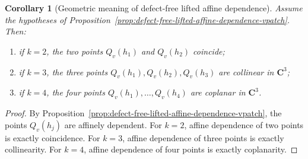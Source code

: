 \documentclass[11pt,a4paper]{amsart}
\theoremstyle{plain}
\newtheorem{corollary}[theorem]{Corollary}
\theoremstyle{definition}
\begin{document}
\begin{corollary}[Geometric meaning of defect-free lifted affine dependence]
\label{cor:geometric-meaning-defect-free-lifted-affine-dependence-vpatch}
Assume the hypotheses of
Proposition~\ref{prop:defect-free-lifted-affine-dependence-vpatch}. Then:
\begin{enumerate}
\item if $k=2$, the two points $Q_v(h_1)$ and $Q_v(h_2)$ coincide;
\item if $k=3$, the three points $Q_v(h_1),Q_v(h_2),Q_v(h_3)$ are
collinear in $\mathbf C^3$;
\item if $k=4$, the four points $Q_v(h_1),\dots,Q_v(h_4)$ are coplanar in
$\mathbf C^3$.
\end{enumerate}
\end{corollary}

\begin{proof}
By Proposition~\ref{prop:defect-free-lifted-affine-dependence-vpatch}, the
points $Q_v(h_j)$ are affinely dependent. For $k=2$, affine dependence of
two points is exactly coincidence. For $k=3$, affine dependence of three
points is exactly collinearity. For $k=4$, affine dependence of four points
is exactly coplanarity.
\end{proof}
\end{document}
